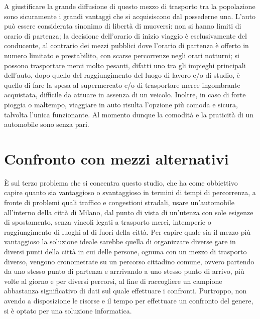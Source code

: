 A giustificare la grande diffusione di questo mezzo di trasporto tra la popolazione sono sicuramente i grandi vantaggi che si acquisiscono dal possederne una. L'auto può essere considerata sinonimo di libertà di muoversi: non si hanno limiti di orario di partenza; la decisione dell'orario di inizio viaggio è esclusivamente del conducente, al contrario dei mezzi pubblici dove l'orario di partenza è offerto in numero limitato e prestabilito, con scarse percorrenze negli orari notturni; si possono trasportare merci molto pesanti, difatti uno tra gli impieghi principali dell'auto, dopo quello del raggiungimento del luogo di lavoro e/o di studio, è quello di fare la spesa al supermercato e/o di trasportare merce ingombrante acquistata, difficile da attuare in assenza di un veicolo. Inoltre, in caso di forte pioggia o maltempo, viaggiare in auto risulta l'opzione più comoda e sicura, talvolta l'unica funzionante. Al momento dunque la comodità e la praticità di un automobile sono senza pari.

\section{Confronto con mezzi alternativi}

È sul terzo problema che si concentra questo studio, che ha come obbiettivo capire quanto sia vantaggioso o svantaggioso in termini di tempi di percorrenza, a fronte di problemi quali traffico e congestioni stradali, usare un'automobile all'interno della città di Milano, dal punto di vista di un'utenza con sole esigenze di spostamento, senza vincoli legati a trasporto merci, intemperie o raggiungimento di luoghi al di fuori della città. Per capire quale sia il mezzo più vantaggioso la soluzione ideale sarebbe quella di organizzare diverse gare in diversi punti della città in cui delle persone, ognuna con un mezzo di trasporto diverso, vengono cronometrate su un percorso cittadino comune, ovvero partendo da uno stesso punto di partenza e arrrivando a uno stesso punto di arrivo, più volte al giorno e per diversi percorsi, al fine di raccogliere un campione abbastanza significativo di dati sul quale effettuare i confronti. Purtroppo, non avendo a disposizione le risorse e il tempo per effettuare un confronto del genere, si è optato per una soluzione informatica.